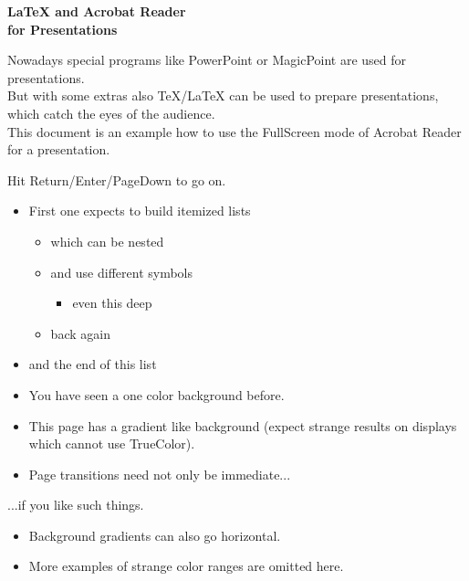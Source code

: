 \documentclass[30pt,landscape]{foils}
\begin{document}
{\Large\normalcolor\bf
  \LaTeX{} and Acrobat Reader\\
  \null\hfill for Presentations\break}

\noindent
Nowadays special programs like PowerPoint or
MagicPoint are used for presentations.\pause\\
But with some extras also \TeX/\LaTeX{} can be used to prepare
presentations, which catch the eyes of the audience.\pause\\
This document is an example how to use the FullScreen mode of Acrobat
Reader for a presentation.\pause

{\tiny
Hit Return/Enter/PageDown to go on.\hfill{}}


\begin{itemize}
\item First one expects to build itemized lists\pause
  \begin{itemize}
  \item which can be nested\pause
  \item and use different symbols
    \begin{itemize}
    \item even this deep\pause
    \end{itemize}
  \item back again\pause
  \end{itemize}
\item and the end of this list
\end{itemize}

\begin{itemize}
\item You have seen a one color background before.
\item This page has a gradient like background (expect strange results
  on displays which cannot use TrueColor).
\item Page transitions need not only be immediate...
\end{itemize}

\hypersetup{pdfpagetransition=Dissolve}
...if you like such things.
\begin{itemize}
\item Background gradients can also go horizontal.\pause
\item More examples of strange color ranges are omitted here.
\end{itemize}
\end{document}
